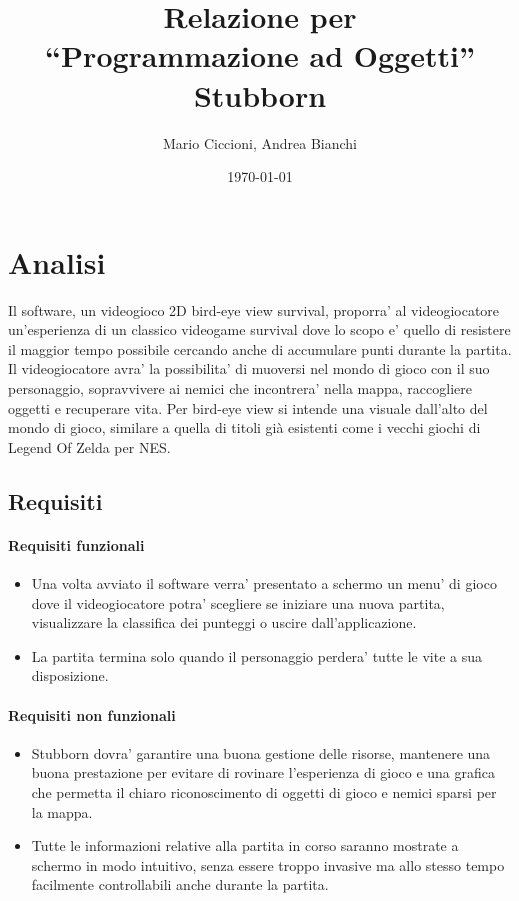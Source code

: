 \documentclass[a4paper,12pt]{report}
\title{Relazione per\\``Programmazione ad Oggetti''\\Stubborn}
\author{Mario Ciccioni, Andrea Bianchi}
\date{\today}
\begin{document}
\maketitle

\tableofcontents

\chapter{Analisi}

Il software, un videogioco 2D bird-eye view survival, proporra' al videogiocatore un'esperienza di un classico videogame survival dove lo scopo e' quello di resistere il maggior tempo possibile cercando anche di accumulare punti durante la partita.
Il videogiocatore avra' la possibilita' di muoversi nel mondo di gioco con il suo personaggio, sopravvivere ai nemici che incontrera' nella mappa, raccogliere oggetti e recuperare vita.
Per bird-eye view si intende una visuale dall'alto del mondo di gioco, similare a quella di titoli già esistenti come i vecchi giochi di Legend Of Zelda per NES.

\section{Requisiti}

\subsubsection{Requisiti funzionali}
\begin{itemize}
	\item Una volta avviato il software verra' presentato a schermo un menu' di gioco dove il videogiocatore potra' scegliere se iniziare una nuova partita, visualizzare la classifica dei punteggi o uscire dall'applicazione.
    \item La partita termina solo quando il personaggio perdera' tutte le vite a sua disposizione.
\end{itemize}

\subsubsection{Requisiti non funzionali}
\begin{itemize}
	\item Stubborn dovra' garantire una buona gestione delle risorse, mantenere una buona prestazione per evitare di rovinare l'esperienza di gioco e una grafica che permetta il chiaro riconoscimento di oggetti di gioco e nemici sparsi per la mappa.
    \item Tutte le informazioni relative alla partita in corso saranno mostrate a schermo in modo intuitivo, senza essere troppo invasive ma allo stesso tempo facilmente controllabili anche durante la partita.
\end{itemize}
\end{document}
